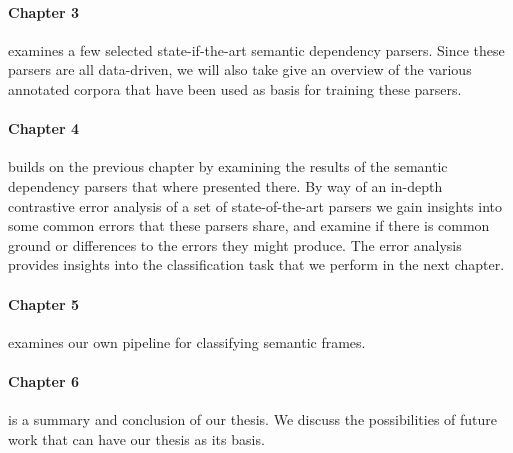 \paragraph{Chapter 3} examines a few selected state-if-the-art semantic dependency parsers. Since these parsers are all data-driven, we will also take give an overview of the various annotated corpora that have been used as basis for training these parsers.

\paragraph{Chapter 4} builds on the previous chapter by examining the results of the semantic dependency parsers that where presented there. By way of an in-depth contrastive error analysis of a set of state-of-the-art parsers we gain insights into some common errors that these parsers share, and examine if there is common ground or differences to the errors they might produce. The error analysis provides insights into the classification task that we perform in the next chapter.

\paragraph{Chapter 5} examines our own pipeline for classifying semantic frames.

\paragraph{Chapter 6} is a summary and conclusion of our thesis. We discuss the possibilities of future work that can have our thesis as its basis.